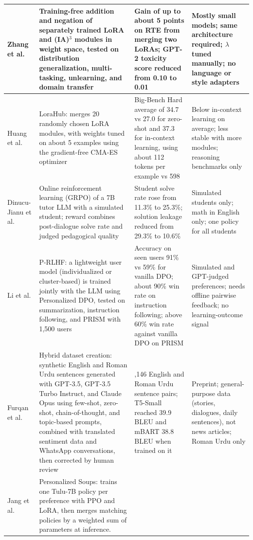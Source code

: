 \documentclass{FastFyp}
\begin{document}
\begin{small}
\begin{longtable}{|>{\raggedright\arraybackslash}p{2.4cm}|>{\raggedright\arraybackslash}p{4.1cm}|>{\raggedright\arraybackslash}p{4.1cm}|>{\raggedright\arraybackslash}p{3.6cm}|}
Zhang et al. \cite{zhang2023composing} & Training-free addition and negation of separately trained LoRA and (IA)$^3$ modules in weight space, tested on distribution generalization, multi-tasking, unlearning, and domain transfer & Gain of up to about 5 points on RTE from merging two LoRAs; GPT-2 toxicity score reduced from 0.10 to 0.01 & Mostly small models; same architecture required; $\lambda$ tuned manually; no language or style adapters \\
\hline
Huang et al. \cite{huang2024lorahub} & LoraHub: merges 20 randomly chosen LoRA modules, with weights tuned on about 5 examples using the gradient-free CMA-ES optimizer & Big-Bench Hard average of 34.7 vs 27.0 for zero-shot and 37.3 for in-context learning, using about 112 tokens per example vs 598 & Below in-context learning on average; less stable with more modules; reasoning benchmarks only \\
\hline
Dinucu-Jianu et al. \cite{dinucujianu2025teaching} & Online reinforcement learning (GRPO) of a 7B tutor LLM with a simulated student; reward combines post-dialogue solve rate and judged pedagogical quality & Student solve rate rose from 11.3\% to 25.3\%; solution leakage reduced from 29.3\% to 10.6\% & Simulated students only; math in English only; one policy for all students \\
\hline
Li et al. \cite{li2024personalized} & P-RLHF: a lightweight user model (individualized or cluster-based) is trained jointly with the LLM using Personalized DPO, tested on summarization, instruction following, and PRISM with 1,500 users & Accuracy on seen users 91\% vs 59\% for vanilla DPO; about 90\% win rate on instruction following; above 60\% win rate against vanilla DPO on PRISM & Simulated and GPT-judged preferences; needs offline pairwise feedback; no learning-outcome signal \\
\hline
Furqan et al. \cite{furqan2024erupd} & Hybrid dataset creation: synthetic English and Roman Urdu sentences generated with GPT-3.5, GPT-3.5 Turbo Instruct, and Claude Opus using few-shot, zero-shot, chain-of-thought, and topic-based prompts, combined with translated sentiment data and WhatsApp conversations, then corrected by human review & 75,146 English and Roman Urdu sentence pairs; T5-Small reached 39.9 BLEU and mBART 38.8 BLEU when trained on it & Preprint; general-purpose data (stories, dialogues, daily sentences), not news articles; Roman Urdu only \\
\hline
Jang et al. \cite{jang2023personalized} &
Personalized Soups: trains one Tulu-7B policy per preference with PPO and LoRA, then merges matching policies by a weighted sum of parameters at inference. &

\end{longtable}
\end{small}
\end{document}
